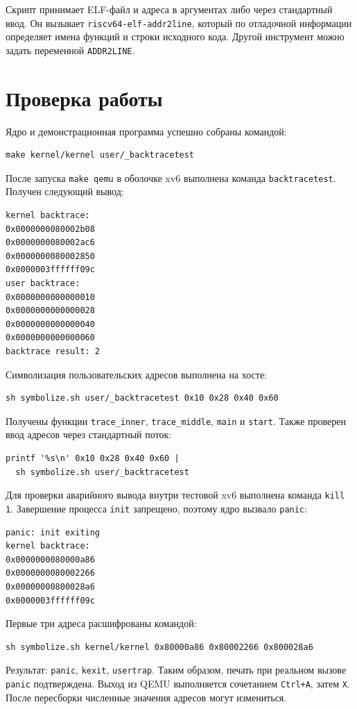 \documentclass[12pt,a4paper]{article}
\begin{document}
Скрипт  принимает ELF-файл и адреса в аргументах либо через стандартный ввод. Он вызывает \texttt{riscv64-elf-addr2line}, который по отладочной информации определяет имена функций и строки исходного кода. Другой инструмент можно задать переменной \texttt{ADDR2LINE}.

\section{Проверка работы}

Ядро и демонстрационная программа успешно собраны командой:
\begin{verbatim}
make kernel/kernel user/_backtracetest
\end{verbatim}

После запуска \texttt{make qemu} в оболочке xv6 выполнена команда \texttt{backtracetest}. Получен следующий вывод:
\begin{verbatim}
kernel backtrace:
0x0000000080002b08
0x0000000080002ac6
0x0000000080002850
0x0000003ffffff09c
user backtrace:
0x0000000000000010
0x0000000000000028
0x0000000000000040
0x0000000000000060
backtrace result: 2
\end{verbatim}

Символизация пользовательских адресов выполнена на хосте:
\begin{verbatim}
sh symbolize.sh user/_backtracetest 0x10 0x28 0x40 0x60
\end{verbatim}
Получены функции \texttt{trace\_inner}, \texttt{trace\_middle}, \texttt{main} и \texttt{start}. Также проверен ввод адресов через стандартный поток:
\begin{verbatim}
printf '%s\n' 0x10 0x28 0x40 0x60 |
  sh symbolize.sh user/_backtracetest
\end{verbatim}

Для проверки аварийного вывода внутри тестовой xv6 выполнена команда \texttt{kill 1}. Завершение процесса \texttt{init} запрещено, поэтому ядро вызвало \texttt{panic}:
\begin{verbatim}
panic: init exiting
kernel backtrace:
0x0000000080000a86
0x0000000080002266
0x00000000800028a6
0x0000003ffffff09c
\end{verbatim}

Первые три адреса расшифрованы командой:
\begin{verbatim}
sh symbolize.sh kernel/kernel 0x80000a86 0x80002266 0x800028a6
\end{verbatim}
Результат: \texttt{panic}, \texttt{kexit}, \texttt{usertrap}. Таким образом, печать при реальном вызове \texttt{panic} подтверждена. Выход из QEMU выполняется сочетанием \texttt{Ctrl+A}, затем \texttt{X}. После пересборки численные значения адресов могут измениться.
\end{document}
